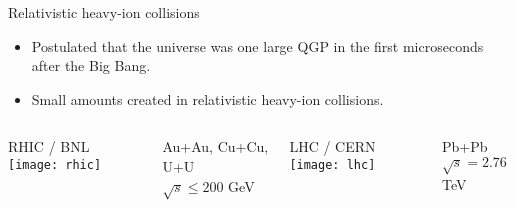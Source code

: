 \documentclass{beamer}
\begin{document}
\begin{frame}{Relativistic heavy-ion collisions}
  \begin{itemize}
    \item Postulated that the universe was one large QGP in the first microseconds after the Big Bang.
    \item Small amounts created in relativistic heavy-ion collisions.
  \end{itemize}

  \bgs

  \begin{columns}
    \centering
    \strut RHIC / BNL
    \texttt{[image: rhic]} \\
    \strut Au+Au, Cu+Cu, U+U \\
    $\sqrt s \leq 200$ GeV

    \centering
    \strut LHC / CERN
    \texttt{[image: lhc]} \\
    \strut Pb+Pb \\
    $\sqrt s = 2.76$ TeV
  \end{columns}
\end{frame}
\end{document}

